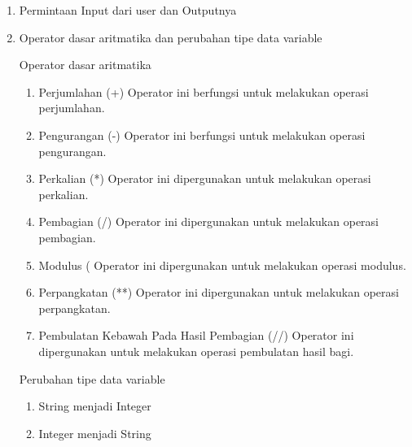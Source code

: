 \begin{enumerate}
\item Permintaan Input dari user dan Outputnya


\item Operator dasar aritmatika dan perubahan tipe data variable

Operator dasar aritmatika
\begin{enumerate}
\item Perjumlahan (+)
Operator ini berfungsi untuk melakukan operasi perjumlahan.

\item Pengurangan (-)
Operator ini berfungsi untuk melakukan operasi pengurangan.

\item Perkalian (*)
Operator ini dipergunakan untuk melakukan operasi perkalian.

\item Pembagian (/)
Operator ini dipergunakan untuk melakukan operasi pembagian.

\item Modulus (%
Operator ini dipergunakan untuk melakukan operasi modulus.

\item Perpangkatan (**)
Operator ini dipergunakan untuk melakukan operasi perpangkatan.

\item Pembulatan Kebawah Pada Hasil Pembagian (//)
Operator ini dipergunakan untuk melakukan operasi pembulatan hasil bagi.

\end{enumerate}

Perubahan tipe data variable
\begin{enumerate}
\item String menjadi Integer

\item Integer menjadi String

\end{enumerate}



\end{enumerate}
